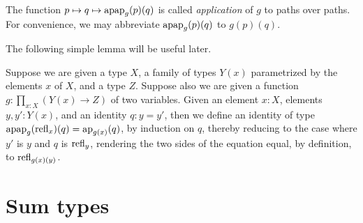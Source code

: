 The function $p \mapsto q \mapsto \apap g p q$ is called \emph{application} of $g$ to paths over paths.
For convenience, we may abbreviate $\apap g p q$ to $g(p)(q)$.

The following simple lemma will be useful later.

\begin{definition}\label{def:applfun2comp}
  Suppose we are given a type $X$, a family of types $Y(x)$ parametrized by the elements $x$ of $X$, and a type $Z$.  Suppose also we are given
  a function $g : \prod_{x:X} (Y(x) \to Z)$ of two variables.  Given an element $x:X$, elements $y, y':Y(x)$, and an identity $q : y = y'$, then
  we define an identity of type $\apap g {\refl x} q = \ap {g(x)}(q)$, by induction on $q$, thereby reducing to the case where $y'$ is
  $y$ and $q$ is $\mathrm{refl}_{y}$, rendering the two sides of the equation equal, by definition, to $\mathrm{refl}_{g(x)(y)}$.
\end{definition}

\section{Sum types}
\label{sec:sum-types}

